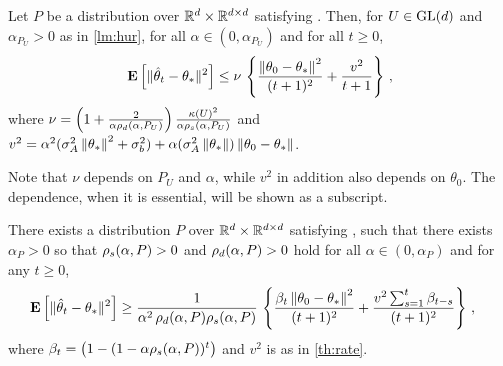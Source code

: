 \begin{theorem}\label{th:rate}
Let $P$ be a distribution over $\mathbb{R}^d\times \mathbb{R}^{d \times d}$ satisfying .
Then, for  $U\in\mathrm{GL}(d)$ and $\alpha_{P_U}>0$ as in \cref{lm:hur},
for all $\alpha\in (0,\alpha_{P_U})$ and for all $t\ge 0$,
\begin{align*}
\mathbf{E}\left[\| \hat{\theta}_t-\theta_*\|^2\right]
\leq
\nu\,
\left\{\frac{\left\| \theta_0-\theta_*\right\|^2}{(t+1)^2}+ \frac{v^2}{t+1} \right\}\,,
\end{align*}
where $\nu = \left(1+\tfrac2{\alpha\rho_d(\alpha,P_U)}\right)\tfrac{\kappa(U)^2}{\alpha \rho_s(\alpha,P_U)}$ and
$v^2 = 
\alpha^2(\sigma_A^2\left\| \theta_*\right\|^2+\sigma_b^2)+\alpha (\sigma_A^2\left\| \theta_*\right\|)\left\| \theta_0-\theta_*\right\|$.
\end{theorem}
Note that $\nu$ depends on $P_U$ and $\alpha$, while $v^2$ in addition also depends on $\theta_0$. The dependence,  when it is essential, will be shown as a subscript.
\begin{theorem}\label{th:lb}
There exists a distribution $P$ over $\mathbb{R}^d\times \mathbb{R}^{d \times d}$ satisfying , such that
there exists $\alpha_P>0$ so that $\rho_s(\alpha,P)>0$ and $\rho_d(\alpha,P)>0$ hold for all $\alpha\in (0,\alpha_P)$ and
for any $t\ge 0$, 
\begin{align*}
\mathbf{E}\left[\| \hat{\theta}_t-\theta_*\|^2\right] 
&\geq \frac{1}{\alpha^2 \, \rho_d(\alpha,P)\rho_s(\alpha,P)} \,\left\{ \frac{\beta_t \left\| \theta_0-\theta_*\right\|^2}{(t+1)^2} 
+ \frac{v^2\sum_{s=1}^t \beta_{t-s}  }{(t+1)^2} \right\}\,,
\end{align*}
where $\beta_{t} =  \big(1-(1-\alpha \rho_s(\alpha,P))^t\big)$ and $v^2$ is as in \cref{th:rate}.
\begin{comment}
\begin{align}
\frac{1}{(t+1)^2}(\alpha \lambda_{\min})^{-2}(1-\alpha \lambda_{\min}^t) \theta^2_0(1)\leq \norm{\eh_t}^2\leq
\frac{1}{(t+1)^2} \left(\alpha^{-1}\rhos{P^0}+\alpha^{-2}\rhos{P^0}^2\right)\norm{\theta_0}^2
\end{align}
\end{comment}
\end{theorem}
